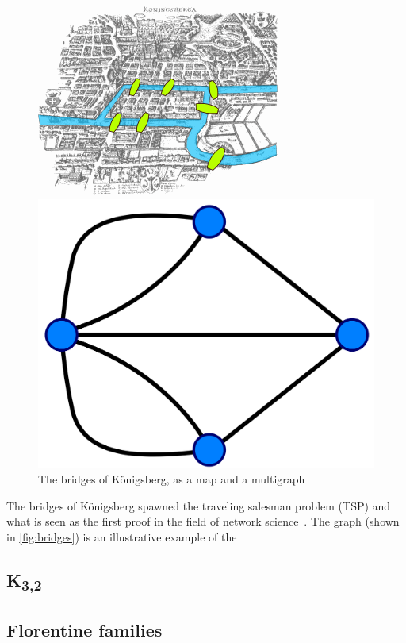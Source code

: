 \begin{figure}
\centering
\begin{minipage}{0.45\linewidth}
\centering
\includegraphics[width=\textwidth]{fig/bridges_map}
\end{minipage}
\begin{minipage}{0.45\linewidth}
\includegraphics[width=\textwidth]{fig/bridges_graph}
\end{minipage}
\caption{The bridges of K\"onigsberg, as a map and a multigraph}
\label{fig:bridges}
\end{figure}

The bridges of K\"onigsberg spawned the traveling salesman problem (TSP) and what is seen as the first proof in the field of network science~\cite{newman2003structure}. The graph (shown in \autoref{fig:bridges}) is an illustrative example of the 

\subsection{K\textsubscript{3,2}}

\subsection{Florentine families}

